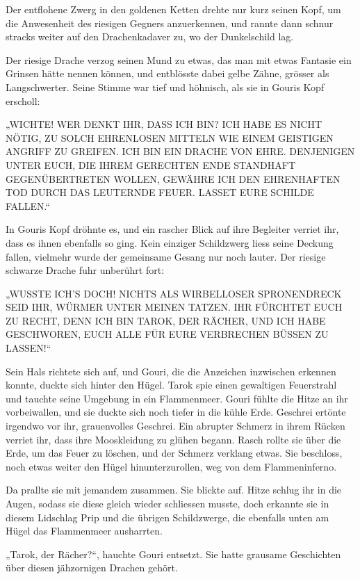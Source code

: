 Der entflohene Zwerg in den goldenen Ketten drehte nur kurz seinen Kopf, um die Anwesenheit des riesigen Gegners anzuerkennen, und rannte dann schnur stracks weiter auf den Drachenkadaver zu, wo der Dunkelschild lag.

Der riesige Drache verzog seinen Mund zu etwas, das man mit etwas Fantasie ein Grinsen hätte nennen können, und entblösste dabei gelbe Zähne, grösser als Langschwerter. Seine Stimme war tief und höhnisch, als sie in Gouris Kopf erscholl:

„WICHTE! WER DENKT IHR, DASS ICH BIN? ICH HABE ES NICHT NÖTIG, ZU SOLCH EHRENLOSEN MITTELN WIE EINEM GEISTIGEN ANGRIFF ZU GREIFEN. ICH BIN EIN DRACHE VON EHRE. DENJENIGEN UNTER EUCH, DIE IHREM GERECHTEN ENDE STANDHAFT GEGENÜBERTRETEN WOLLEN, GEWÄHRE ICH DEN EHRENHAFTEN TOD DURCH DAS LEUTERNDE FEUER. LASSET EURE SCHILDE FALLEN.“

In Gouris Kopf dröhnte es, und ein rascher Blick auf ihre Begleiter verriet ihr, dass es ihnen ebenfalls so ging. Kein einziger Schildzwerg liess seine Deckung fallen, vielmehr wurde der gemeinsame Gesang nur noch lauter. Der riesige schwarze Drache fuhr unberührt fort:

„WUSSTE ICH’S DOCH! NICHTS ALS WIRBELLOSER SPRONENDRECK SEID IHR, WÜRMER UNTER MEINEN TATZEN. IHR FÜRCHTET EUCH ZU RECHT, DENN ICH BIN TAROK, DER RÄCHER, UND ICH HABE GESCHWOREN, EUCH ALLE FÜR EURE VERBRECHEN BÜSSEN ZU LASSEN!“

Sein Hals richtete sich auf, und Gouri, die die Anzeichen inzwischen erkennen konnte, duckte sich hinter den Hügel. Tarok spie einen gewaltigen Feuerstrahl und tauchte seine Umgebung in ein Flammenmeer. Gouri fühlte die Hitze an ihr vorbeiwallen, und sie duckte sich noch tiefer in die kühle Erde. Geschrei ertönte irgendwo vor ihr, grauenvolles Geschrei. Ein abrupter Schmerz in ihrem Rücken verriet ihr, dass ihre Mooskleidung zu glühen begann. Rasch rollte sie über die Erde, um das Feuer zu löschen, und der Schmerz verklang etwas. Sie beschloss, noch etwas weiter den Hügel hinunterzurollen, weg von dem Flammeninferno.

Da prallte sie mit jemandem zusammen. Sie blickte auf. Hitze schlug ihr in die Augen, sodass sie diese gleich wieder schliessen musste, doch erkannte sie in diesem Lidschlag Prip und die übrigen Schildzwerge, die ebenfalls unten am Hügel das Flammenmeer ausharrten.

„Tarok, der Rächer?“, hauchte Gouri entsetzt. Sie hatte grausame Geschichten über diesen jähzornigen Drachen gehört.


